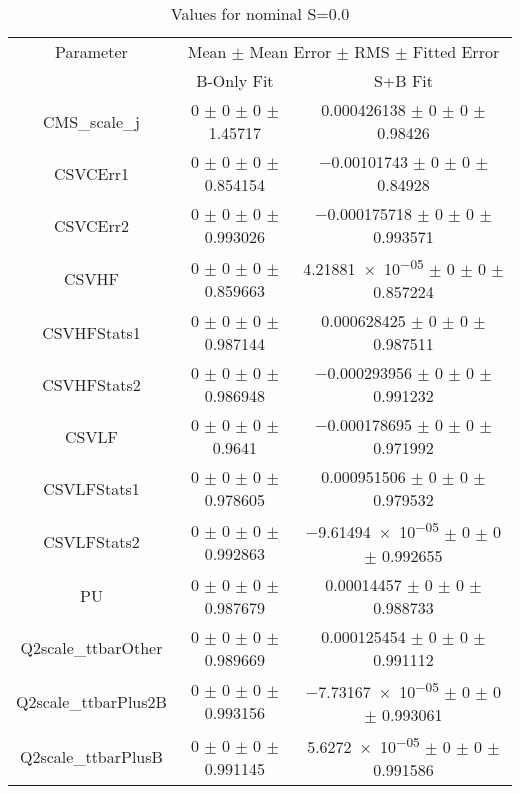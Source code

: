 \begin{table}
\centering
\caption{Values for nominal S=0.0}
\begin{tabular}{ccc}
\toprule
Parameter & \multicolumn{2}{c}{Mean $\pm$ Mean Error $\pm$ RMS $\pm$ Fitted Error}\\
 & B-Only Fit & S+B Fit\\
\midrule
CMS\_scale\_j & \num{0} $\pm$ \num{0} $\pm$ \num{0} $\pm$ \num{1.45717} & \num{0.000426138} $\pm$ \num{0} $\pm$ \num{0} $\pm$ \num{0.98426}\\
CSVCErr1 & \num{0} $\pm$ \num{0} $\pm$ \num{0} $\pm$ \num{0.854154} & \num{-0.00101743} $\pm$ \num{0} $\pm$ \num{0} $\pm$ \num{0.84928}\\
CSVCErr2 & \num{0} $\pm$ \num{0} $\pm$ \num{0} $\pm$ \num{0.993026} & \num{-0.000175718} $\pm$ \num{0} $\pm$ \num{0} $\pm$ \num{0.993571}\\
CSVHF & \num{0} $\pm$ \num{0} $\pm$ \num{0} $\pm$ \num{0.859663} & \num{4.21881e-05} $\pm$ \num{0} $\pm$ \num{0} $\pm$ \num{0.857224}\\
CSVHFStats1 & \num{0} $\pm$ \num{0} $\pm$ \num{0} $\pm$ \num{0.987144} & \num{0.000628425} $\pm$ \num{0} $\pm$ \num{0} $\pm$ \num{0.987511}\\
CSVHFStats2 & \num{0} $\pm$ \num{0} $\pm$ \num{0} $\pm$ \num{0.986948} & \num{-0.000293956} $\pm$ \num{0} $\pm$ \num{0} $\pm$ \num{0.991232}\\
CSVLF & \num{0} $\pm$ \num{0} $\pm$ \num{0} $\pm$ \num{0.9641} & \num{-0.000178695} $\pm$ \num{0} $\pm$ \num{0} $\pm$ \num{0.971992}\\
CSVLFStats1 & \num{0} $\pm$ \num{0} $\pm$ \num{0} $\pm$ \num{0.978605} & \num{0.000951506} $\pm$ \num{0} $\pm$ \num{0} $\pm$ \num{0.979532}\\
CSVLFStats2 & \num{0} $\pm$ \num{0} $\pm$ \num{0} $\pm$ \num{0.992863} & \num{-9.61494e-05} $\pm$ \num{0} $\pm$ \num{0} $\pm$ \num{0.992655}\\
PU & \num{0} $\pm$ \num{0} $\pm$ \num{0} $\pm$ \num{0.987679} & \num{0.00014457} $\pm$ \num{0} $\pm$ \num{0} $\pm$ \num{0.988733}\\
Q2scale\_ttbarOther & \num{0} $\pm$ \num{0} $\pm$ \num{0} $\pm$ \num{0.989669} & \num{0.000125454} $\pm$ \num{0} $\pm$ \num{0} $\pm$ \num{0.991112}\\
Q2scale\_ttbarPlus2B & \num{0} $\pm$ \num{0} $\pm$ \num{0} $\pm$ \num{0.993156} & \num{-7.73167e-05} $\pm$ \num{0} $\pm$ \num{0} $\pm$ \num{0.993061}\\
Q2scale\_ttbarPlusB & \num{0} $\pm$ \num{0} $\pm$ \num{0} $\pm$ \num{0.991145} & \num{5.6272e-05} $\pm$ \num{0} $\pm$ \num{0} $\pm$ \num{0.991586}\\

\end{tabular}
\end{table}
